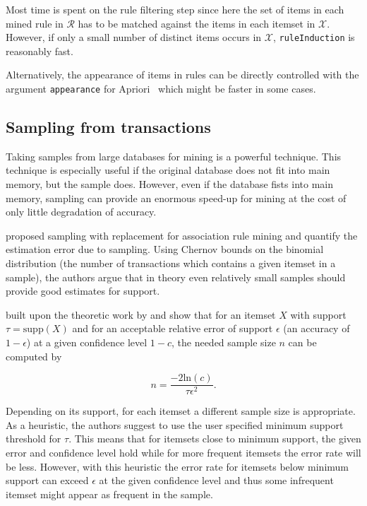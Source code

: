 \documentclass[10pt,a4paper]{article}
\newcommand{\code}[1]{\texttt{#1}}
\newcommand{\set}[1]{\mathcal{#1}}
\begin{document}
Most time is spent on the rule filtering step since here 
the set of items in each mined rule in $\set{R}$ has to be matched 
against the items in each itemset in $\set{X}$. 
However, if only a small number of distinct items occurs in $\set{X}$,
\code{ruleInduction} is reasonably fast.

Alternatively, the appearance of items in rules can be directly controlled
with the argument \code{appearance} for 
Apriori~\citep[see][]{arules:Borgelt:2004} which might be faster in some cases. 



\subsection{Sampling from transactions\label{sec:sample}}
Taking samples from large databases for mining is a
powerful technique. This technique is especially useful if the 
original database does not fit into main memory, but the sample does.
However, even if the database fists into main memory, sampling can provide
an enormous speed-up for mining at the cost of only little 
degradation of accuracy.

\cite{arules:Mannila+Toivonen+Verkamo:1994}
proposed sampling with replacement for association rule mining
and quantify the estimation error due to sampling.
Using Chernov bounds on the binomial distribution (the number of
transactions which contains a given itemset in a sample),
the authors argue that in theory even relatively small samples 
should provide good estimates for support.

\cite{arules:Zaki+Parthasarathy+Li+Ogihara:1997} 
built upon the theoretic work by \cite{arules:Mannila+Toivonen+Verkamo:1994}
and show that for an itemset $X$ 
with support $\tau = \mathrm{supp}(X)$
and for an acceptable relative error of support $\epsilon$
(an accuracy of $1 - \epsilon$)
at a given confidence level $1-c$,
the needed sample size $n$ can 
be computed by

\begin{equation}
n = \frac{-2\mathrm{ln}(c)}{\tau\epsilon^2}.
\label{equ:samplesize}
\end{equation}

Depending on its support, for each 
itemset a different sample size
is appropriate.  
As a heuristic, the authors suggest to use the user specified minimum
support threshold for $\tau$.
This means that for itemsets close to minimum support, the given
error and confidence level hold while for more frequent itemsets the
error rate will be less. However, with this heuristic the error rate for
itemsets below minimum support can exceed $\epsilon$ at the given 
confidence level and thus some infrequent itemset might appear 
as frequent in the sample.
\end{document}
